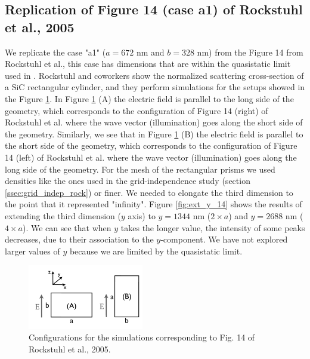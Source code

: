 \subsection{Replication of Figure 14 (case a1) of Rockstuhl et al., 2005}

We replicate the case "a1" ($a=672$ nm and $b=328$ nm) from the Figure 14 from Rockstuhl et al., 
this case has dimensions that are within the quasistatic limit used in \pygbe. Rockstuhl and coworkers show the normalized
scattering cross-section of a SiC rectangular cylinder, and they perform simulations for the setups showed in the Figure
\ref{fig:rectangle_sketch}. In Figure \ref{fig:rectangle_sketch} (A) the electric field is parallel to the long side of the geometry, which 
corresponds to the configuration of Figure 14 (right) of Rockstuhl et al. where the wave vector (illumination) goes along the short side of the geometry. 
Similarly, we see that in Figure \ref{fig:rectangle_sketch} (B) the electric field is parallel to the short side of the geometry, which 
corresponds to the configuration of Figure 14 (left) of Rockstuhl et al. where the wave vector (illumination) goes along the long side of the geometry.
For the mesh of the rectangular prisms we used densities like the ones used in the grid-independence study (section \ref{ssec:grid_indep_rock}) or finer. We 
needed to elongate the third dimension to the point that it represented "infinity". Figure \ref{fig:ext_y_14} shows the results of extending the third 
dimension ($y$ axis) to $y=1344$ nm ($2\times a$) and $y=2688$ nm ($4\times a$). We can see that when $y$ takes the longer value, the intensity of 
some peaks decreases, due to their association to the $y$-component. We have not explored larger values of $y$ because we are limited by the quasistatic limit.

 \begin{figure}
    \centering
    \includegraphics[width=0.45\textwidth]{rockstuhl_rectangles.pdf} 
    \caption{Configurations for the simulations corresponding to Fig. 14 of Rockstuhl et al., 2005.}
    \label{fig:rectangle_sketch}
\end{figure}

